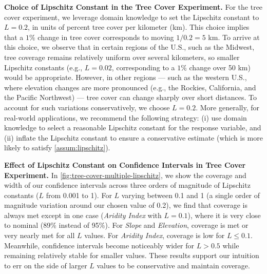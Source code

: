 \textbf{Choice of Lipschitz Constant in the Tree Cover Experiment.}
For the tree cover experiment, we leverage domain knowledge to set the Lipschitz constant to $L = 0.2$, in units of percent tree cover per kilometer (km). This choice implies that a $1\%$ change in tree cover corresponds to moving $1 / 0.2 = 5$ km. To arrive at this choice, we observe that in certain regions of the U.S., such as the Midwest, tree coverage remains relatively uniform over several kilometers, so smaller Lipschitz constants (e.g., $L = 0.02$, corresponding to a $1\%$ change over 50 km) would be appropriate. However, in other regions --- such as the western U.S., where elevation changes are more pronounced (e.g., the Rockies, California, and the Pacific Northwest) --- tree cover can change sharply over short distances. To account for such variations conservatively, we choose $L = 0.2$. More generally, for real-world applications, we recommend the following strategy: (i) use domain knowledge to select a reasonable Lipschitz constant for the response variable, and (ii) inflate the Lipschitz constant to ensure a conservative estimate (which is more likely to satisfy \cref{assum:lipschitz}).

\textbf{Effect of Lipschitz Constant on Confidence Intervals in Tree Cover Experiment.}
In \cref{fig:tree-cover-multiple-lipschitz}, 
we show the coverage and width of our confidence intervals across three orders of magnitude of Lipschitz constants ($L$ from 0.001 to 1). For $L$ varying between 0.1 and 1 (a single order of magnitude variation around our chosen value of 0.2), we find that coverage is always met except in one case (\textit{Aridity Index} with $L=0.1$), where it is very close to nominal (89\% instead of 95\%). For \textit{Slope} and \textit{Elevation}, coverage is met or very nearly met for all $L$ values. For \textit{Aridity Index}, coverage is low for $L \leq 0.1$. Meanwhile, confidence intervals become noticeably wider for $L > 0.5$ while remaining relatively stable for smaller values. These results support our intuition to err on the side of larger $L$ values to be conservative and maintain coverage.

